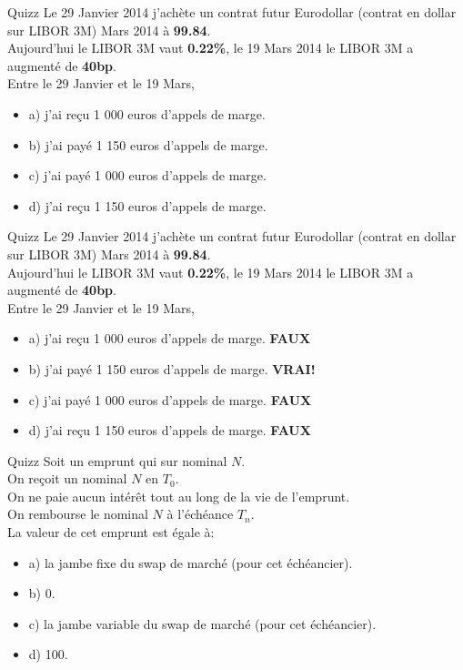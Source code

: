 \documentclass{beamer}
\begin{document}
\begin{frame}{Quizz}
Le 29 Janvier 2014 j'achète un contrat futur Eurodollar (contrat en dollar sur LIBOR 3M) Mars 2014 à \textbf{99.84}.\\
Aujourd'hui le LIBOR 3M vaut \textbf{0.22\%}, le 19 Mars 2014 le LIBOR 3M a augmenté de \textbf{40bp}.\\
\vspace{0.5cm}
Entre le 29 Janvier et le 19 Mars,\\
\begin{itemize}
\item a) j'ai reçu 1 000 euros d'appels de marge.
\item b) j'ai payé 1 150 euros d'appels de marge.
\item c) j'ai payé 1 000 euros d'appels de marge.
\item d) j'ai reçu 1 150 euros d'appels de marge.

\end{itemize}
\end{frame}
\begin{frame}{Quizz}
Le 29 Janvier 2014 j'achète un contrat futur Eurodollar (contrat en dollar sur LIBOR 3M) Mars 2014 à \textbf{99.84}.\\
Aujourd'hui le LIBOR 3M vaut \textbf{0.22\%}, le 19 Mars 2014 le LIBOR 3M a augmenté de \textbf{40bp}.\\
\vspace{0.5cm}
Entre le 29 Janvier et le 19 Mars,\\
\begin{itemize}
\item a) j'ai reçu 1 000 euros d'appels de marge. \textbf{\color{red}FAUX}
\item b) j'ai payé 1 150 euros d'appels de marge. \textbf{\color{green}VRAI!}
\item c) j'ai payé 1 000 euros d'appels de marge. \textbf{\color{red}FAUX}
\item d) j'ai reçu 1 150 euros d'appels de marge. \textbf{\color{red}FAUX}

\end{itemize}
\end{frame}

\begin{frame}{Quizz}
Soit un emprunt qui sur nominal $N$.\\ 
On reçoit un nominal $N$ en $T_0$.\\
On ne paie aucun intérêt tout au long de la vie de l'emprunt.\\
On rembourse le nominal $N$ à l'échéance $T_n$.\\
\vspace{0.5cm}
La valeur de cet emprunt est égale à:
\begin{itemize}
\item a) la jambe fixe du swap de marché (pour cet échéancier).
\item b) 0.
\item c) la jambe variable du swap de marché (pour cet échéancier).
\item d) 100.
\end{itemize}
\end{frame}
\end{document}
